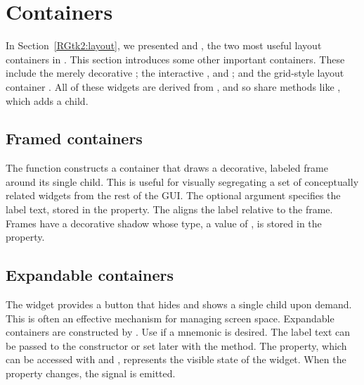 \section{Containers}
\label{sec:containers}

In Section~\ref{RGtk2:layout}, we presented  and
, the two most useful layout containers in
\GTK. This section introduces some other important containers. These
include the merely decorative ; the interactive
,  and ; and the
grid-style layout container . All of these widgets are
derived from , and so share methods like
, which adds a child.

\subsection{Framed containers}
\label{sec:RGtk2:gtkFrame}

The  function constructs a container that draws
a decorative, labeled frame around its single child. This is useful
for visually segregating a set of conceptually related widgets from
the rest of the GUI.  The optional  argument
specifies the label text, stored in the  property. The
 aligns the label relative to the
frame.  Frames have a decorative shadow whose type, a value of
, is stored in the  property.

\subsection{Expandable containers}
\label{sec:RGtk2:gtkExpander}

The  widget provides a button that hides and shows
a single child upon demand. This is often an effective mechanism for
managing screen space. Expandable containers are constructed by
. Use  if a
mnemonic is desired. The label text can be passed to the constructor
or set later with the  method. The
 property, which can be accessed with
 and
, represents the visible state of the
widget.  When the  property changes, the
 signal is emitted.


